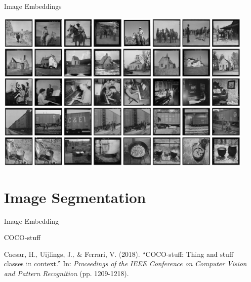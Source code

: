 \documentclass[12pt,ignorenonframetext,aspectratio=169]{beamer}
\makeatletter
\newcommand{\orange}[1]{\textcolor{solarized@orange}{#1}}
\makeatother
\begin{document}
\begin{frame}{Image Embeddings}

\begin{center}
\includegraphics[width=0.95\textwidth]{img/fig3.jpg}
\end{center}

\end{frame}

\section{Image Segmentation}

\begin{frame}{Image Embedding}

\orange{COCO-stuff}

Caesar, H., Uijlings, J., \& Ferrari, V. (2018). ``COCO-stuff: Thing and stuff classes
in context.'' In: \textit{Proceedings of the IEEE Conference on Computer Vision and Pattern
Recognition} (pp. 1209-1218).

\end{frame}
\end{document}
